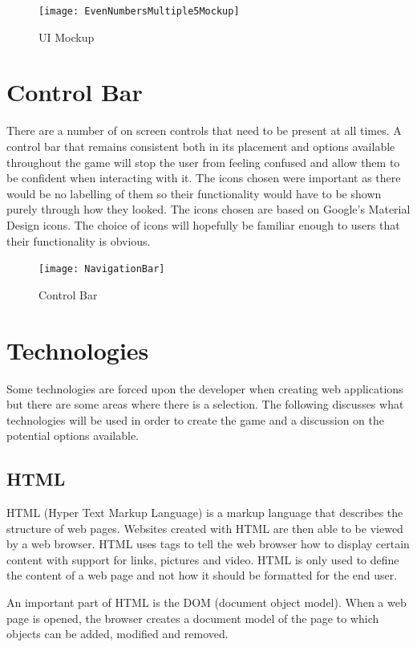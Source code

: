 \documentclass[12pt,a4paper]{report}
\begin{document}
\begin{figure}[h]
  \centering
  \begin{minipage}[b]{1\textwidth}
    \texttt{[image: EvenNumbersMultiple5Mockup]}
    \caption{UI Mockup}
  \end{minipage}
\end{figure}
\FloatBarrier

\section{Control Bar}
There are a number of on screen controls that need to be present at all times. A control bar that remains consistent both in its placement and options available throughout the game will stop the user from feeling confused and allow them to be confident when interacting with it. The icons chosen were important as there would be no labelling of them so their functionality would have to be shown purely through how they looked. The icons chosen are based on Google's Material Design icons. The choice of icons will hopefully be familiar enough to users that their functionality is obvious.

\begin{figure}[h]
\centering
    \texttt{[image: NavigationBar]}
    \caption{Control Bar}
    \label{fig:floodFillBad}
\end{figure}
\FloatBarrier

\section{Technologies}
Some technologies are forced upon the developer when creating web applications but there are some areas where there is a selection. The following discusses what technologies will be used in order to create the game and a discussion on the potential options available. 

\subsection{HTML}
HTML (Hyper Text Markup Language) is a markup language that describes the structure of web pages. Websites created with HTML are then able to be viewed by a web browser. HTML uses tags to tell the web browser how to display certain content with support for links, pictures and video. HTML is only used to define the content of a web page and not how it should be formatted for the end user.

An important part of HTML is the DOM (document object model). When a web page is opened, the browser creates a document model of the page to which objects can be added, modified and removed. 
\end{document}

